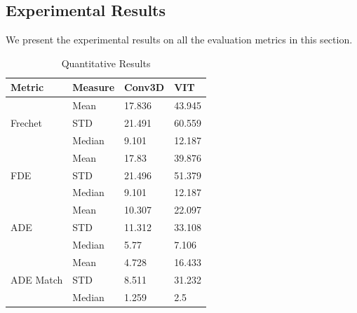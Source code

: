 \documentclass[11pt]{article}
\begin{document}
% 
\subsection{Experimental Results}

We present the experimental results on all the evaluation metrics in this section.


\begin{table}[]
    \begin{tabular}{@{}llll@{}}
    \toprule
    Metric                                          & Measure & Conv3D & VIT    \\ \midrule
    \multicolumn{1}{l|}{\multirow{3}{*}{Frechet}}   & Mean    & 17.836 & 43.945 \\
    \multicolumn{1}{l|}{}                           & STD     & 21.491 & 60.559 \\
    \multicolumn{1}{l|}{}                           & Median  & 9.101  & 12.187 \\ \cline{1-1}
    \multicolumn{1}{l|}{\multirow{3}{*}{FDE}}       & Mean    & 17.83  & 39.876 \\
    \multicolumn{1}{l|}{}                           & STD     & 21.496 & 51.379 \\
    \multicolumn{1}{l|}{}                           & Median  & 9.101  & 12.187 \\ \cline{1-1}
    \multicolumn{1}{l|}{\multirow{3}{*}{ADE}}       & Mean    & 10.307 & 22.097 \\
    \multicolumn{1}{l|}{}                           & STD     & 11.312 & 33.108 \\
    \multicolumn{1}{l|}{}                           & Median  & 5.77   & 7.106  \\ \cline{1-1}
    \multicolumn{1}{l|}{\multirow{3}{*}{ADE Match}} & Mean    & 4.728  & 16.433 \\
    \multicolumn{1}{l|}{}                           & STD     & 8.511  & 31.232 \\
    \multicolumn{1}{l|}{}                           & Median  & 1.259  & 2.5    \\ \bottomrule
    \end{tabular}
    \caption{Quantitative Results}
    \label{fig:quantitative}
\end{table}
\end{document}
